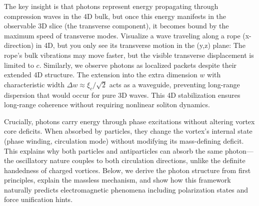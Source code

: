 The key insight is that photons represent energy propagating through compression waves in the 4D bulk, but once this energy manifests in the observable 3D slice (the transverse component), it becomes bound by the maximum speed of transverse modes. Visualize a wave traveling along a rope (x-direction) in 4D, but you only see its transverse motion in the (y,z) plane: The rope's bulk vibrations may move faster, but the visible transverse displacement is limited to $c$. Similarly, we observe photons as localized packets despite their extended 4D structure. The extension into the extra dimension $w$ with characteristic width $\Delta w \approx \xi_c/\sqrt{2}$ acts as a waveguide, preventing long-range dispersion that would occur for pure 3D waves. This 4D stabilization ensures long-range coherence without requiring nonlinear soliton dynamics.

Crucially, photons carry energy through phase excitations without altering vortex core deficits. When absorbed by particles, they change the vortex's internal state (phase winding, circulation mode) without modifying its mass-defining deficit. This explains why both particles and antiparticles can absorb the same photon---the oscillatory nature couples to both circulation directions, unlike the definite handedness of charged vortices. Below, we derive the photon structure from first principles, explain the massless mechanism, and show how this framework naturally predicts electromagnetic phenomena including polarization states and force unification hints.

